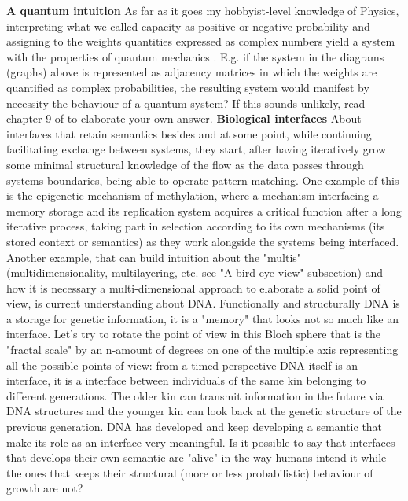 \documentclass[14pt,a4paper]{extarticle}
\begin{document}
\newline
\hspace*{7.5mm}\textbf{A quantum intuition}
\newline
As far as it goes my hobbyist-level knowledge of Physics, interpreting what we called capacity as positive or negative probability and assigning to the weights quantities expressed as complex numbers yield a system with the properties of quantum mechanics \cite{Aaronson10.5555/2487754}. E.g. if the system in the diagrams (graphs) above is represented as adjacency matrices in which the weights are quantified as complex probabilities, the resulting system would manifest by necessity the behaviour of a quantum system? If this sounds unlikely, read chapter 9 of \cite{Aaronson10.5555/2487754} to elaborate your own answer.
\newline
\hspace*{7.5mm}\textbf{Biological interfaces}
\newline
About interfaces that retain semantics besides and at some point, while continuing facilitating exchange between systems, they start, after having iteratively grow some minimal structural knowledge of the flow as the data passes through systems boundaries, being able to operate pattern-matching. One example of this is the epigenetic mechanism of methylation, where a mechanism interfacing a memory storage and its replication system acquires a critical function after a long iterative process, taking part in selection according to its own mechanisms (its stored context or semantics) as they work alongside the systems being interfaced.
Another example, that can build intuition about the "multis" (multidimensionality, multilayering, etc. see "A bird-eye view" subsection) and how it is necessary a multi-dimensional approach to elaborate a solid point of view, is current understanding about DNA. Functionally and structurally DNA is a storage for genetic information, it is a "memory" that looks not so much like an interface. Let's try to rotate the point of view in this Bloch sphere that is the "fractal scale" by an n-amount of degrees on one of the multiple axis representing all the possible points of view: from a timed perspective DNA itself is an interface, it is a interface between individuals of the same kin belonging to different generations. The older kin can transmit information in the future via DNA structures and the younger kin can look back at the genetic structure of the previous generation. DNA has developed and keep developing a semantic that make its role as an interface very meaningful. Is it possible to say that interfaces that develops their own semantic are "alive" in the way humans intend it while the ones that keeps their structural (more or less probabilistic) behaviour of growth are not? 
\end{document}
